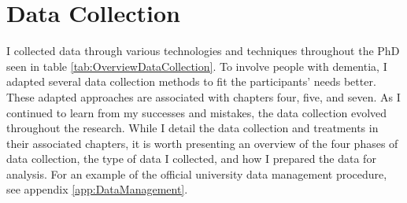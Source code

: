 \section{Data Collection}
\label{Method:DataCollection}
I collected data through various technologies and techniques throughout the PhD seen in table \ref{tab:OverviewDataCollection}. To involve people with dementia, I adapted several data collection methods to fit the participants' needs better. These adapted approaches are associated with chapters four, five, and seven. As I continued to learn from my successes and mistakes, the data collection evolved throughout the research. While I detail the data collection and treatments in their associated chapters, it is worth presenting an overview of the four phases of data collection, the type of data I collected, and how I prepared the data for analysis. For an example of the official university data management procedure, see appendix \ref{app:DataManagement}.

\begin{table}[htp]
\centering
\caption{Overview of collected data}
\label{tab:OverviewDataCollection}
\end{table}

